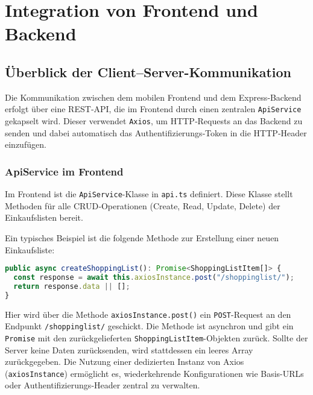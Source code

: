 \chapter{Integration von Frontend und Backend}
\renewcommand{\authorinitials}{DH}

\label{chap:integration}

\section{Überblick der Client–Server-Kommunikation}
Die Kommunikation zwischen dem mobilen Frontend und dem Express‑Backend erfolgt über eine REST‑API, die im Frontend durch einen zentralen \texttt{ApiService} gekapselt wird. Dieser verwendet \texttt{Axios}, um HTTP‑Requests an das Backend zu senden und dabei automatisch das Authentifizierungs‑Token in die HTTP‑Header einzufügen.

\subsection{ApiService im Frontend}
Im Frontend ist die \texttt{ApiService}-Klasse in \texttt{api.ts} definiert. Diese Klasse stellt Methoden für alle CRUD‑Operationen (Create, Read, Update, Delete) der Einkaufslisten bereit. 

Ein typisches Beispiel ist die folgende Methode zur Erstellung einer neuen Einkaufsliste:

\begin{lstlisting}[language=TypeScript,caption={Definition der \texttt{createShoppingList}-Methode im \texttt{ApiService}}]
public async createShoppingList(): Promise<ShoppingListItem[]> {
  const response = await this.axiosInstance.post("/shoppinglist/");
  return response.data || [];
}
\end{lstlisting}

Hier wird über die Methode \texttt{axiosInstance.post()} ein \texttt{POST}-Request an den Endpunkt \texttt{/shoppinglist/} geschickt. Die Methode ist asynchron und gibt ein \texttt{Promise} mit den zurückgelieferten \texttt{ShoppingListItem}-Objekten zurück. Sollte der Server keine Daten zurücksenden, wird stattdessen ein leeres Array zurückgegeben. Die Nutzung einer dedizierten Instanz von Axios (\texttt{axiosInstance}) ermöglicht es, wiederkehrende Konfigurationen wie Basis-URLs oder Authentifizierungs‑Header zentral zu verwalten.

